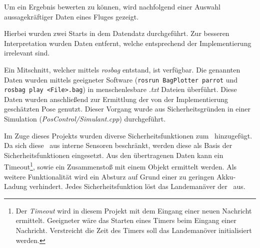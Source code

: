 
Um ein Ergebnis bewerten zu können, wird nachfolgend einer Auswahl aussagekräftiger Daten eines Fluges gezeigt. 





Hierbei wurden zwei Starts in dem Datendatz durchgeführt. Zur besseren Interpretation wurden Daten entfernt, welche entsprechend der Implementierung irrelevant sind.

Ein Mitschnitt, welcher mittels \textit{rosbag} entstand, ist verfügbar. Die genannten Daten wurden mittels geeigneter Software (\texttt{rosrun BagPlotter parrot} und \texttt{rosbag play <File>.bag}) in menschenlesbare \textit{.txt} Dateien überführt. Diese Daten wurden anschließend zur Ermittlung der von der Implementierung geschätzten Pose genutzt. Dieser Vorgang wurde aus Sicherheitsgründen in einer Simulation (\textit{PosControl/Simulant.cpp}) durchgeführt.




Im Zuge dieses Projekts wurden diverse Sicherheitsfunktionen zum \Quad\ hinzugefügt. Da sich diese \Arbeit\ aus interne Sensoren beschränkt, werden diese als Basis der Sicherheitsfunktionen eingesetzt.
Aus den übertragenen Daten kann ein Timeout\footnote{Der \textit{Timeout} wird in diesem Projekt mit dem Eingang einer neuen Nachricht ermittelt. Geeigneter wäre das Starten eines Timers beim Eingang einer Nachricht. Verstreicht die Zeit des Timers soll das Landemanöver initialisiert werden.}, sowie ein Zusammenstoß mit einem Objekt ermittelt werden. Als weitere Funktionalität wird ein Absturz auf Grund einer zu geringen Akku-Ladung verhindert. Jedes Sicherheitsfunktion löst das Landemanäver der \Ar\ aus.
















